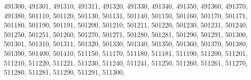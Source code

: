 \textquotesingle{}491300\textquotesingle{}, \textquotesingle{}491301\textquotesingle{}, \textquotesingle{}491310\textquotesingle{}, \textquotesingle{}491311\textquotesingle{}, \textquotesingle{}491320\textquotesingle{}, \textquotesingle{}491330\textquotesingle{}, \textquotesingle{}491340\textquotesingle{}, \textquotesingle{}491350\textquotesingle{}, \textquotesingle{}491360\textquotesingle{}, \textquotesingle{}491370\textquotesingle{}, \textquotesingle{}491380\textquotesingle{}, \textquotesingle{}501110\textquotesingle{}, \textquotesingle{}501120\textquotesingle{}, \textquotesingle{}501130\textquotesingle{}, \textquotesingle{}501131\textquotesingle{}, \textquotesingle{}501140\textquotesingle{}, \textquotesingle{}501150\textquotesingle{}, \textquotesingle{}501160\textquotesingle{}, \textquotesingle{}501170\textquotesingle{}, \textquotesingle{}501171\textquotesingle{}, \textquotesingle{}501180\textquotesingle{}, \textquotesingle{}501190\textquotesingle{}, \textquotesingle{}501191\textquotesingle{}, \textquotesingle{}501200\textquotesingle{}, \textquotesingle{}501210\textquotesingle{}, \textquotesingle{}501211\textquotesingle{}, \textquotesingle{}501220\textquotesingle{}, \textquotesingle{}501230\textquotesingle{}, \textquotesingle{}501231\textquotesingle{}, \textquotesingle{}501240\textquotesingle{}, \textquotesingle{}501250\textquotesingle{}, \textquotesingle{}501251\textquotesingle{}, \textquotesingle{}501260\textquotesingle{}, \textquotesingle{}501270\textquotesingle{}, \textquotesingle{}501271\textquotesingle{}, \textquotesingle{}501280\textquotesingle{}, \textquotesingle{}501281\textquotesingle{}, \textquotesingle{}501290\textquotesingle{}, \textquotesingle{}501291\textquotesingle{}, \textquotesingle{}501300\textquotesingle{}, \textquotesingle{}501301\textquotesingle{}, \textquotesingle{}501310\textquotesingle{}, \textquotesingle{}501311\textquotesingle{}, \textquotesingle{}501320\textquotesingle{}, \textquotesingle{}501330\textquotesingle{}, \textquotesingle{}501340\textquotesingle{}, \textquotesingle{}501350\textquotesingle{}, \textquotesingle{}501360\textquotesingle{}, \textquotesingle{}501370\textquotesingle{}, \textquotesingle{}501380\textquotesingle{}, \textquotesingle{}501390\textquotesingle{}, \textquotesingle{}501400\textquotesingle{}, \textquotesingle{}501410\textquotesingle{}, \textquotesingle{}511150\textquotesingle{}, \textquotesingle{}511170\textquotesingle{}, \textquotesingle{}511180\textquotesingle{}, \textquotesingle{}511181\textquotesingle{}, \textquotesingle{}511190\textquotesingle{}, \textquotesingle{}511200\textquotesingle{}, \textquotesingle{}511201\textquotesingle{}, \textquotesingle{}511210\textquotesingle{}, \textquotesingle{}511220\textquotesingle{}, \textquotesingle{}511221\textquotesingle{}, \textquotesingle{}511230\textquotesingle{}, \textquotesingle{}511240\textquotesingle{}, \textquotesingle{}511241\textquotesingle{}, \textquotesingle{}511250\textquotesingle{}, \textquotesingle{}511260\textquotesingle{}, \textquotesingle{}511261\textquotesingle{}, \textquotesingle{}511270\textquotesingle{}, \textquotesingle{}511280\textquotesingle{}, \textquotesingle{}511281\textquotesingle{}, \textquotesingle{}511290\textquotesingle{}, \textquotesingle{}511291\textquotesingle{}, \textquotesingle{}511300\textquotesingle{}, 